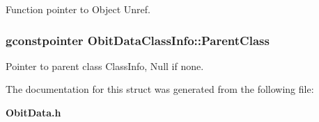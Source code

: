 Function pointer to Object Unref. 

\subsubsection{\setlength{\rightskip}{0pt plus 5cm}gconstpointer {\bf Obit\-Data\-Class\-Info::Parent\-Class}}\label{structObitDataClassInfo_o3}


Pointer to parent class Class\-Info, Null if none. 



The documentation for this struct was generated from the following file:\begin{CompactItemize}
\item 
{\bf Obit\-Data.h}\end{CompactItemize}
